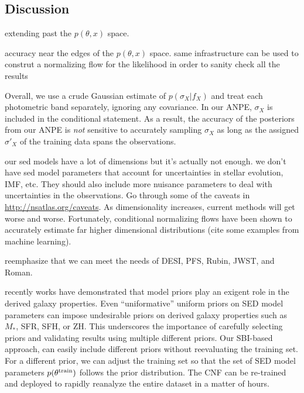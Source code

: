 \subsection{Discussion} \label{sec:discuss}
extending past the $p(\theta, x)$ space.

accuracy near the edges of the $p(\theta, x)$ space. same infrastructure can be
used to construt a normalizing flow for the likelihood in order to sanity check
all the results 



Overall, we use a crude Gaussian estimate of $p(\sigma_X | f_X)$ and treat each
photometric band separately, ignoring any covariance. 
In our ANPE, $\sigma_X$ is included in the conditional statement. 
As a result, the accuracy of the posteriors from our ANPE is \emph{not}
sensitive to accurately sampling $\sigma_X$ as long as the assigned $\sigma'_X$
of the training data spans the observations.  


our sed models have a lot of dimensions but it's actually not enough. 
we don't have sed model parameters that account for uncertainties in stellar
evolution, IMF, etc. 
They should also include more nuisance parameters to deal with uncertainties in
the observations. 
Go through some of the caveats in \url{http://nsatlas.org/caveats}. 
As dimensionality increases, current methods will get worse and worse. 
Fortunately, conditional normalizing flows have been shown to accurately
estimate far higher dimensional distributions (cite some examples from machine
learning). 

reemphasize that we can meet the needs of DESI, PFS, Rubin, JWST, and Roman. 

recently works have demonstrated that model priors play an exigent role in the
derived galaxy properties. 
Even ``uniformative'' uniform priors on SED model parameters can impose
undesirable priors on derived galaxy properties such as $M_*$, SFR, SFH, or
ZH.
This underscores the importance of carefully selecting priors and validating
results using multiple different priors. 
Our SBI-based approach, can easily include different priors without
reevaluating the training set.
For a different prior, we can adjust the training set so that the set of SED
model parameters $p(\theta^{\rm train})$ follows the prior distribution. 
The CNF can be re-trained and deployed to rapidly reanalyze the entire dataset
in a matter of hours. 



